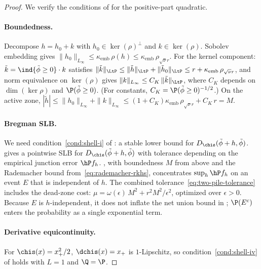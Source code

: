 \documentclass{article}
\begin{document}
\begin{proof}
We verify the conditions
of 
for the positive-part quadratic.

\paragraph{Boundedness.}
Decompose $h = h_0 + k$
with $h_0 \in \ker(\rho)^\perp$
and $k \in \ker(\rho)$.
Sobolev embedding gives
$\|h_0\|_{L_\infty}
  \le \kappa_{\mathrm{emb}}\, \rho(h)
  \le \kappa_{\mathrm{emb}}\, \rho_{\sqrt{\nu}r}$.
For the kernel component:
$\tilde k = \ind{\tilde\phi \ge 0} \cdot k$ satisfies
$\|\tilde k\|_{\LtP}
  \le \|\tilde h\|_{\LtP} + \|\tilde h_0\|_{\LtP}
  \le r + \kappa_{\mathrm{emb}}\, \rho_{\sqrt{\nu}r}$,
and norm equivalence on $\ker(\rho)$ gives
$\|k\|_{L_\infty}
  \le C_K\, \|\tilde k\|_{\LtP}$,
where $C_K$ depends on $\dim(\ker\rho)$
and $\P(\tilde\phi \ge 0)$.
(For constants, $C_K = \P(\tilde\phi \ge 0)^{-1/2}$.)
On the active zone,
$|\tilde h|
  \le \|h_0\|_{L_\infty} + \|k\|_{L_\infty}
  \le (1+C_K)\kappa_{\mathrm{emb}}\, \rho_{\sqrt{\nu}r}
    + C_K\, r
  = M$.

\paragraph{Bregman SLB\@.}
We need condition~\ref{cond:shell-i}
of :
a stable lower bound
for $D_{\chis}(\tilde\phi + h, \tilde\phi)$.
 gives a pointwise SLB
for $D_{\chis}(\tilde\phi + h, \tilde\phi)$
with tolerance depending on
the empirical junction error $\hP f_h$.
,
with boundedness $M$ from above
and the Rademacher bound
from~\eqref{eq:rademacher-rkhs},
concentrates $\sup_h \hP f_h$
on an event $E$
that is independent of $h$.
The combined tolerance~\eqref{eq:two-pile-tolerance} includes
the dead-zone cost:
$\mu = \omega(\epsilon)\, M^2 + r^2 M^2/\epsilon^2$,
optimized over $\epsilon > 0$.
Because $E$ is $h$-independent,
it does not inflate the net union bound
in ;
$\P(E^c)$ enters the probability
as a single exponential term.

\paragraph{Derivative equicontinuity.}
For $\chis(x) = x_+^2/2$,
$\dchis(x) = x_+$ is $1$-Lipschitz,
so condition~\ref{cond:shell-iv}
of 
holds with $L = 1$ and $\Q = \P$.


\end{proof}
\end{document}

